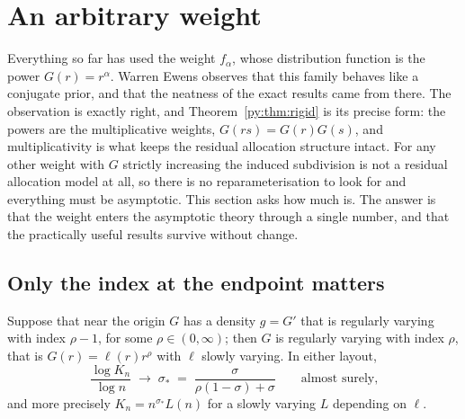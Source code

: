 \section{An arbitrary weight}
\label{py:sec:arbitrary}

Everything so far has used the weight $f_\alpha$, whose distribution function is the power
$G(r) = r^{\alpha}$. Warren Ewens observes that this family behaves like a conjugate prior, and that
the neatness of the exact results came from there. The observation is exactly right, and
Theorem~\ref{py:thm:rigid} is its precise form: the powers are the multiplicative weights,
$G(rs) = G(r)G(s)$, and multiplicativity is what keeps the residual allocation structure intact. For
any other weight with $G$ strictly increasing the induced subdivision is not a residual allocation model at all, so there is no
reparameterisation to look for and everything must be asymptotic. This section asks how much is.
The answer is that the weight enters the asymptotic theory through a single number, and that the
practically useful results survive without change.

\subsection{Only the index at the endpoint matters}
\label{py:sec:index}

\begin{proposition}
\label{py:prop:index}
Suppose that near the origin $G$ has a density $g = G'$ that is regularly varying with index
$\rho - 1$, for some $\rho \in (0,\infty)$; then $G$ is regularly varying with index $\rho$, that is
$G(r) = \ell(r)r^{\rho}$ with $\ell$ slowly varying. In either layout,
\[
\frac{\log K_n}{\log n} \;\longrightarrow\; \sigma_* \;=\; \frac{\sigma}{\rho(1-\sigma)+\sigma}
\qquad\text{almost surely,}
\]
and more precisely $K_n = n^{\sigma_*}L(n)$ for a slowly varying $L$ depending on $\ell$.
\end{proposition}

